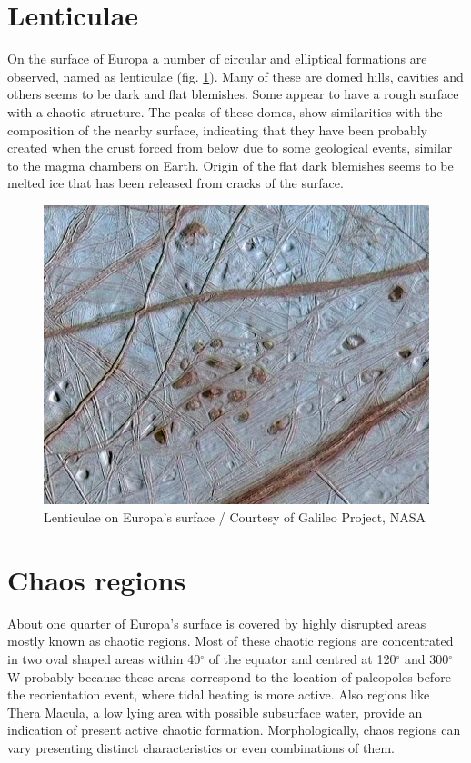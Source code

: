 \section{Lenticulae}\label{sec:lenticulae}
On the surface of Europa a number of circular and elliptical formations are observed, named as lenticulae (fig. \ref{fig:lenticulae}). Many of these are domed hills, cavities and others seems to be dark and flat blemishes. Some appear to have a rough surface with a chaotic structure. The peaks of these domes, show similarities with the composition of the nearby surface, indicating that they have been probably created when the crust forced from below due to some geological events, similar to the magma chambers on Earth. Origin of the flat dark blemishes seems to be melted ice that has been released from cracks of the surface.
\begin{figure}[htb]
    \centering
    \includegraphics[scale=0.3]{figures/Orbiter/lenticulae.jpg}
    \caption{Lenticulae on Europa's surface / Courtesy of Galileo Project, NASA}
    \label{fig:lenticulae}
\end{figure}
\section{Chaos regions}
About one quarter of Europa’s surface is covered by highly disrupted areas mostly known as chaotic regions.  Most of these chaotic regions are concentrated in two oval shaped areas within 40$^{\circ}$ of the equator and centred at 120$^{\circ}$ and 300$^{\circ}$ W probably because these areas correspond to the location of paleopoles before the reorientation event, where tidal heating is more active. Also regions like Thera Macula, a low lying area with possible subsurface water, provide an indication of present active chaotic formation. Morphologically, chaos regions can vary presenting distinct characteristics or even combinations of them.


